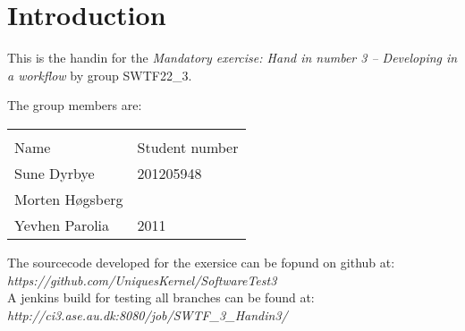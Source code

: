 \section{Introduction}

This is the handin for the \textit{Mandatory exercise: Hand in number 3 – Developing in a workflow} by group SWTF22_3.

The group members are:

\begin{table}
\centering
\begin{tabular}{|l|l|}
\hline\\
Name & Student number\\
Sune Dyrbye & 201205948\\
Morten Høgsberg & \\
Yevhen Parolia & 2011\\
\end{tabular}
\end{table}

The sourcecode developed for the exersice can be fopund on github at: 
\textit{https://github.com/UniquesKernel/SoftwareTest3} \\

A jenkins build for testing all branches can be found at: \textit{http://ci3.ase.au.dk:8080/job/SWTF_3_Handin3/}

\newpage
